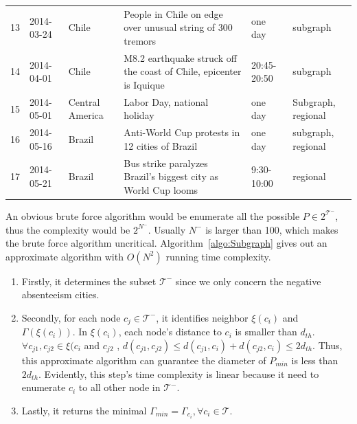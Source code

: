\begin{table}[t]
\begin{tabular}{ p{0.4cm}|l|l| p{8cm}|l | l}
        13& 2014-03-24 & Chile & People in Chile on edge over unusual string of 300 tremors &one day&subgraph\\
        14& 2014-04-01 & Chile &  M8.2 earthquake struck off the coast of Chile, epicenter is Iquique & 20:45-20:50 &subgraph \\
        15& 2014-05-01 &Central America& Labor Day, national holiday &one day &Subgraph, regional \\
        16& 2014-05-16 & Brazil & Anti-World Cup protests in 12 cities of Brazil &one day& subgraph, regional \\
        17& 2014-05-21 & Brazil & Bus strike paralyzes Brazil's biggest city as World Cup looms &9:30-10:00& regional\\				
		\hline
	\end{tabular}
\end{table}



An obvious brute force algorithm would be enumerate all the possible $P\in 2^\mathcal{T^-}$, thus the complexity would be $2^{N^-}$. Usually $N^-$ is larger than 100, which makes the brute force algorithm uncritical. Algorithm~\ref{algo:Subgraph} gives out an approximate algorithm with $O(N^2)$ running time complexity.
\begin{enumerate}
  \item Firstly, it determines the subset $\mathcal{T}^-$ since we only concern the negative absenteeism cities.
  \item Secondly, for each node $c_j \in \mathcal{T}^-$, it identifies neighbor $\xi(c_i)$ and $\Gamma(\xi(c_i))$. In $\xi(c_i)$,  each node's distance to $c_i$ is smaller than $d_{th}$. $\forall c_{j1}, c_{j2}\in \xi(c_i$ and $c_{j2}$ , $d(c_{j1}, c_{j2})\leq d(c_{j1}, c_i)+d(c_{j2}, c_i)\leq 2d_{th}$. Thus, this approximate algorithm can guarantee the diameter of $P_{min}$ is less than $2d_{th}$. Evidently, this step's time complexity is linear because it need to enumerate $c_i$ to all other node in $\mathcal{T}^-$.
  \item Lastly, it returns the minimal $\Gamma_{min}=\Gamma_{c_i}, \forall c_i\in \mathcal{T}$.
\end{enumerate}




